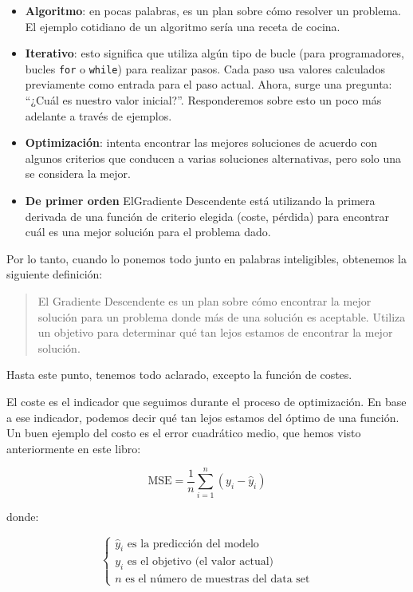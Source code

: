 \documentclass[
]{book}
\providecommand{\tightlist}{%
  \setlength{\itemsep}{0pt}\setlength{\parskip}{0pt}}
\begin{document}
\begin{itemize}
\tightlist
\item
  \textbf{Algoritmo}: en pocas palabras, es un plan sobre cómo resolver un problema. El ejemplo cotidiano de un algoritmo sería una receta de cocina.
\item
  \textbf{Iterativo}: esto significa que utiliza algún tipo de bucle (para programadores, bucles \texttt{for} o \texttt{while}) para realizar pasos. Cada paso usa valores calculados previamente como entrada para el paso actual. Ahora, surge una pregunta: ``¿Cuál es nuestro valor inicial?''. Responderemos sobre esto un poco más adelante a través de ejemplos.
\item
  \textbf{Optimización}: intenta encontrar las mejores soluciones de acuerdo con algunos criterios que conducen a varias soluciones alternativas, pero solo una se considera la mejor.
\item
  \textbf{De primer orden} ElGradiente Descendente está utilizando la primera derivada de una función de criterio elegida (coste, pérdida) para encontrar cuál es una mejor solución para el problema dado.
\end{itemize}

Por lo tanto, cuando lo ponemos todo junto en palabras inteligibles, obtenemos la siguiente definición:

\begin{quote}
El Gradiente Descendente es un plan sobre cómo encontrar la mejor solución para un problema donde más de una solución es aceptable. Utiliza un objetivo para determinar qué tan lejos estamos de encontrar la mejor solución.
\end{quote}

Hasta este punto, tenemos todo aclarado, excepto la función de costes.

El coste es el indicador que seguimos durante el proceso de optimización. En base a ese indicador, podemos decir qué tan lejos estamos del óptimo de una función. Un buen ejemplo del costo es el error cuadrático medio, que hemos visto anteriormente en este libro:

\[\textrm{MSE} = \frac{1}{n} \sum_{i=1}^n (y_i - \hat{y}_i)\]

donde:

\[    
\begin{cases}
        \textrm{$\hat{y}_i$ es la predicción del modelo} \\
        \textrm{$y_i$ es el objetivo (el valor actual)} \\
        \textrm{$n$ es el número de muestras del data set}
    \end{cases}
\]
\end{document}
